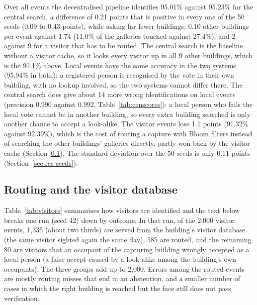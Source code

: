 \documentclass[12pt,a4paper,oneside]{report}
\begin{document}
Over all events the decentralised pipeline identifies 95.01\% against 95.23\% for the central search, a difference of 0.21 points that is positive in every one of the 50 seeds (0.09 to 0.43 points), while asking far fewer buildings: 0.10 other buildings per event against 1.74 (11.0\% of the galleries touched against 27.4\%), and 2 against 9 for a visitor that has to be routed. The central search is the baseline without a visitor cache, so it looks every visitor up in all 9 other buildings, which is the 97.1\% above. Local events have the same accuracy in the two systems (95.94\% in both): a registered person is recognised by the vote in their own building, with no lookup involved, so the two systems cannot differ there. The central search does give about 14 more wrong identifications on local events (precision 0.990 against 0.992, Table~\ref{tab:censcores}): a local person who fails the local vote cannot be in another building, so every extra building searched is only another chance to accept a look-alike. The visitor events lose 1.1 points (91.32\% against 92.39\%), which is the cost of routing a capture with Bloom filters instead of searching the other buildings' galleries directly, partly won back by the visitor cache (Section~\ref{sec:res-visitors}). The standard deviation over the 50 seeds is only 0.11 points (Section~\ref{sec:res-seeds}).

\subsection{Routing and the visitor database}\label{sec:res-visitors}
Table~\ref{tab:visitors} summarises how visitors are identified and the text below breaks one run (seed 42) down by outcome. In that run, of the 2,000 visitor events, 1,335 (about two thirds) are served from the building's visitor database (the same visitor sighted again the same day), 585 are routed, and the remaining 80 are visitors that an occupant of the capturing building wrongly accepted as a local person (a false accept caused by a look-alike among the building's own occupants). The three groups add up to 2,000. Errors among the routed events are mostly routing misses that end in an abstention, and a smaller number of cases in which the right building is reached but the face still does not pass verification.
\end{document}

